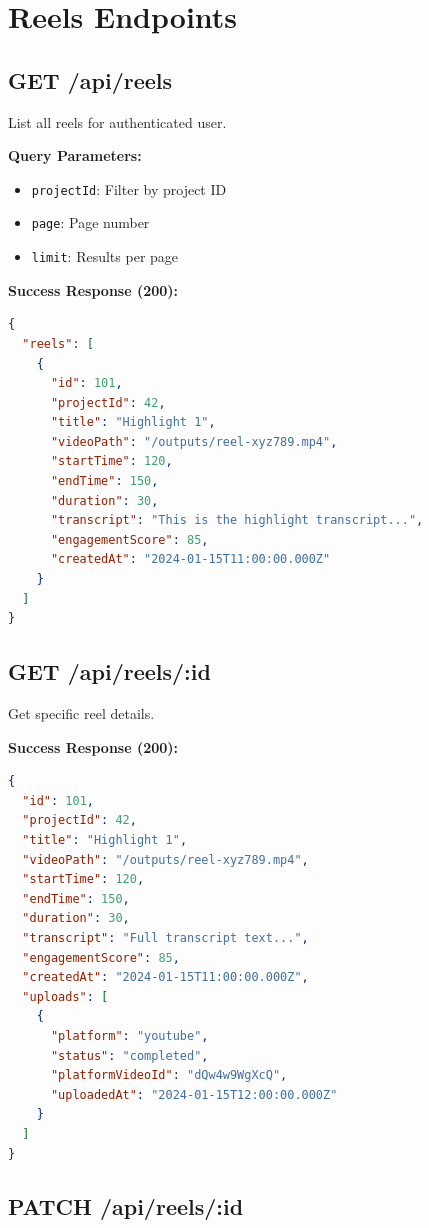 \section{Reels Endpoints}

\subsection{GET /api/reels}

List all reels for authenticated user.

\textbf{Query Parameters:}
\begin{itemize}
    \item \texttt{projectId}: Filter by project ID
    \item \texttt{page}: Page number
    \item \texttt{limit}: Results per page
\end{itemize}

\textbf{Success Response (200):}
\begin{lstlisting}[language=JSON]
{
  "reels": [
    {
      "id": 101,
      "projectId": 42,
      "title": "Highlight 1",
      "videoPath": "/outputs/reel-xyz789.mp4",
      "startTime": 120,
      "endTime": 150,
      "duration": 30,
      "transcript": "This is the highlight transcript...",
      "engagementScore": 85,
      "createdAt": "2024-01-15T11:00:00.000Z"
    }
  ]
}
\end{lstlisting}

\subsection{GET /api/reels/:id}

Get specific reel details.

\textbf{Success Response (200):}
\begin{lstlisting}[language=JSON]
{
  "id": 101,
  "projectId": 42,
  "title": "Highlight 1",
  "videoPath": "/outputs/reel-xyz789.mp4",
  "startTime": 120,
  "endTime": 150,
  "duration": 30,
  "transcript": "Full transcript text...",
  "engagementScore": 85,
  "createdAt": "2024-01-15T11:00:00.000Z",
  "uploads": [
    {
      "platform": "youtube",
      "status": "completed",
      "platformVideoId": "dQw4w9WgXcQ",
      "uploadedAt": "2024-01-15T12:00:00.000Z"
    }
  ]
}
\end{lstlisting}

\subsection{PATCH /api/reels/:id}

